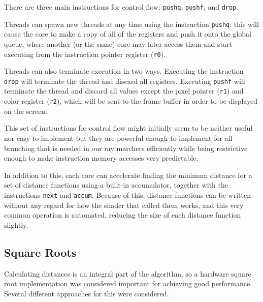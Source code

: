 			There are three main instructions for control flow: \texttt{pushq},
			\texttt{pushf}, and \texttt{drop}. 
			
			Threads can spawn new threads at any time using the instruction
			\texttt{pushq}: this will cause the core to make a copy of all of
			the registers and push it onto the global queue, where another (or
			the same) core may later access them and start executing from the
			instruction pointer register (\texttt{r0}).
			
			Threads can also terminate execution in two ways. Executing the
			instruction \texttt{drop} will terminate the thread and discard all
			registers. Executing \texttt{pushf} will terminate the thread and
			discard all values except the pixel pointer (\texttt{r1}) and color
			register (\texttt{r2}), which will be sent to the frame buffer in
			order to be displayed on the screen.
	
			This set of instructions for control flow might initially seem to
			be neither useful nor easy to implement but they are powerful
			enough to implement for all branching that is needed in our ray
			marchers efficiently while being restrictive enough to make
			instruction memory accesses very predictable.

			In addition to this, each core can accelerate finding the minimum 
			distance for a set of distance functions using a built-in 
			accumulator, together with the instructions \texttt{next} and 
			\texttt{accum}. Because of this, distance functions can be written
			without any regard for how the shader that called them works, and
			this very common operation is automated, reducing the size of each
			distance function slightly.
		
		\subsection{Square Roots}
			
			Calculating distances is an integral part of the algorithm, so a
			hardware square root implementation was considered important for 
			achieving good performance. Several different approaches for this 
			were considered.
			
	

